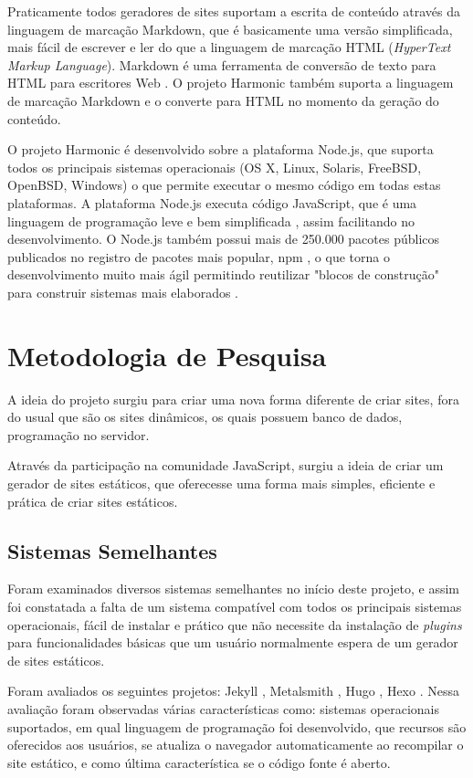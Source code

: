\documentclass[ppginf, pep]{esinucpel}
\begin{document}
Praticamente todos geradores de sites suportam a escrita de conteúdo através da linguagem de marcação Markdown, que é basicamente uma versão simplificada, mais fácil de escrever e ler do que a linguagem de marcação HTML (\textit{HyperText Markup Language}). Markdown é uma ferramenta de conversão de texto para HTML para escritores Web \cite{markdown}. O projeto Harmonic também suporta a linguagem de marcação Markdown e o converte para HTML no momento da geração do conteúdo.

O projeto Harmonic é desenvolvido sobre a plataforma Node.js, que suporta todos os principais sistemas operacionais (OS X, Linux, Solaris, FreeBSD, OpenBSD, Windows) o que permite executar o mesmo código em todas estas plataformas. A plataforma Node.js executa código JavaScript, que é uma linguagem de programação leve e bem simplificada \cite{mdn_js_intro}, assim facilitando no desenvolvimento. O Node.js também possui mais de 250.000 pacotes públicos publicados no registro de pacotes mais popular, npm \cite{npm}, o que torna o desenvolvimento muito mais ágil permitindo reutilizar "blocos de construção"~ para construir sistemas mais elaborados \cite{micromodules}.

\chapter{Metodologia de Pesquisa}

A ideia do projeto surgiu para criar uma nova forma diferente de criar sites, fora do usual que são os sites dinâmicos, os quais possuem banco de dados, programação no servidor. %

Através da participação na comunidade JavaScript, surgiu a ideia de criar um gerador de sites estáticos, que oferecesse uma forma mais simples, eficiente e prática de criar sites estáticos.


\section{Sistemas Semelhantes}

Foram examinados diversos sistemas semelhantes no início deste projeto, e assim foi constatada a falta de um sistema compatível com todos os principais sistemas operacionais, fácil de instalar e prático que não necessite da instalação de \textit{plugins} para funcionalidades básicas que um usuário normalmente espera de um gerador de sites estáticos.

Foram avaliados os seguintes projetos: Jekyll \cite{jekyll}, Metalsmith \cite{metalsmith}, Hugo \cite{hugo}, Hexo \cite{hexo}. Nessa avaliação foram observadas várias características como: sistemas operacionais suportados, em qual linguagem de programação foi desenvolvido, que recursos são oferecidos aos usuários, se atualiza o navegador automaticamente ao recompilar o site estático, e como última característica se o código fonte é aberto.
\end{document}
